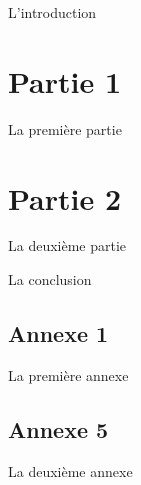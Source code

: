 \documentclass[a4paper,11pt,oneside]{article}
\date{\today}
\begin{document}
	\dosecttoc{}	%
	
	\tableofcontents
	\clearpage
	
    	L'introduction
    
    \clearpage
    \section{Partie 1}
		La première partie
		
    \clearpage
    \section{Partie 2}
		La deuxième partie

    \clearpage
    	La conclusion
    
    
    
    \clearpage
    \appendix
    
    \renewcommand{\stctitle}{Table des annexes}
    \renewcommand\thesubsection{A\arabic{subsection}}
    \renewcommand{\stcSSfont}{}
    \secttoc
    
    
    \clearpage
    \subsection{Annexe 1}
    	La première annexe
    	
    \clearpage
    \subsection{Annexe 5}
    	La deuxième annexe
    
    
\end{document}
